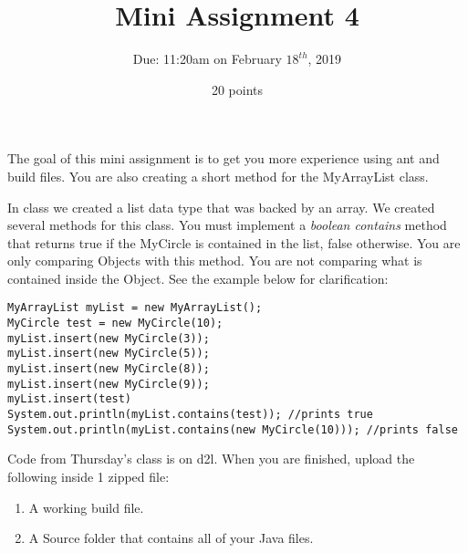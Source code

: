\documentclass[12pt]{article}
\begin{document}
 
\title{Mini Assignment 4}
\author{Due: 11:20am on February $18^{th}$, 2019}
\date{20 points}
\maketitle

The goal of this mini assignment is to get you more experience using ant and build files. You are also creating a short method for the MyArrayList class.

In class we created a list data type that was backed by an array. We created several methods for this class. You must implement a \emph{boolean contains} method that returns true if the MyCircle is contained in the list, false otherwise. You are only comparing Objects with this method. You are not comparing what is contained inside the Object. See the example below for clarification:

\begin{lstlisting}
MyArrayList myList = new MyArrayList();
MyCircle test = new MyCircle(10);
myList.insert(new MyCircle(3));
myList.insert(new MyCircle(5));
myList.insert(new MyCircle(8));
myList.insert(new MyCircle(9));
myList.insert(test)
System.out.println(myList.contains(test)); //prints true
System.out.println(myList.contains(new MyCircle(10))); //prints false
\end{lstlisting}

Code from Thursday's class is on d2l. When you are finished, upload the following inside 1 zipped file:

\begin{enumerate}
    \item A working build file.
    \item A Source folder that contains all of your Java files.
\end{enumerate}
\end{document}
